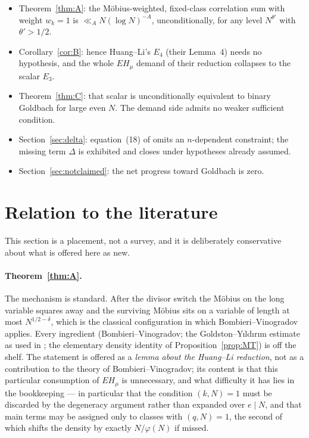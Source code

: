 \documentclass[11pt,a4paper]{article}
\theoremstyle{plain}
\theoremstyle{definition}
\begin{document}
\begin{itemize}
\item Theorem~\ref{thm:A}: the M\"obius-weighted, fixed-class
correlation sum with weight $w_k=1$ is $\ll_A N(\log N)^{-A}$,
unconditionally, for any level $N^{\theta'}$ with $\theta'>1/2$.
\item Corollary~\ref{cor:B}: hence Huang--Li's $E_4$ (their Lemma~4)
needs no hypothesis, and the whole $EH_\mu$ demand of their reduction
collapses to the scalar $E_3$.
\item Theorem~\ref{thm:C}: that scalar is unconditionally equivalent to
binary Goldbach for large even $N$. The demand side admits no weaker
sufficient condition.
\item Section~\ref{sec:delta}: equation~(18) of \cite{HL} omits an
$n$-dependent constraint; the missing term $\Delta$ is exhibited and
closes under hypotheses already assumed.
\item Section~\ref{sec:notclaimed}: the net progress toward Goldbach is
zero.
\end{itemize}

\section{Relation to the literature}\label{sec:lit}

This section is a placement, not a survey, and it is deliberately
conservative about what is offered here as new.

\paragraph{Theorem~\ref{thm:A}.} The mechanism is standard. After the
divisor switch the M\"obius on the long variable squares away and the
surviving M\"obius sits on a variable of length at most
$N^{1/2-\delta}$, which is the classical configuration in which
Bombieri--Vinogradov applies. Every ingredient
(Bombieri--Vinogradov; the Goldston--Y\i ld\i r\i m estimate
\cite{GY} as used in \cite{HL}; the elementary density identity of
Proposition~\ref{prop:MT}) is off the shelf. The statement is offered as
a \emph{lemma about the Huang--Li reduction}, not as a contribution to
the theory of Bombieri--Vinogradov; its content is that this particular
consumption of $EH_\mu$ is unnecessary, and what difficulty it has lies
in the bookkeeping --- in particular that the condition $(k,N)=1$ must
be discarded by the degeneracy argument rather than expanded over
$e\mid N$, and that main terms may be assigned only to classes with
$(q,N)=1$, the second of which shifts the density by exactly
$N/\varphi(N)$ if missed.
\end{document}
